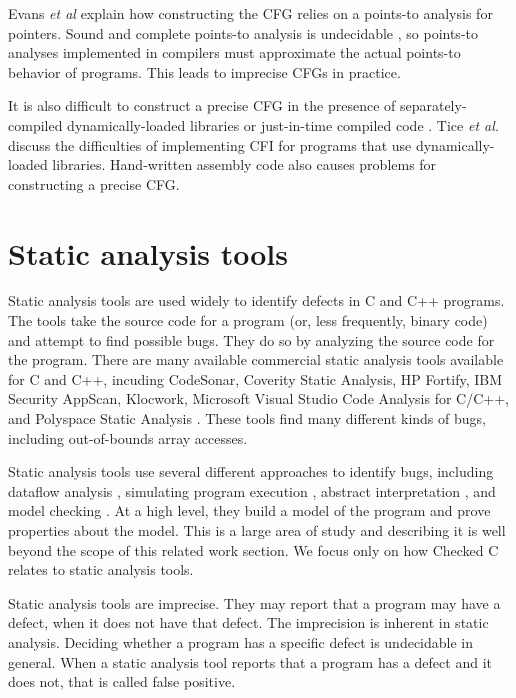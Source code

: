 Evans {\it et al} \cite{Evans2015} explain how constructing the CFG relies on a
points-to analysis for pointers.  Sound and complete points-to analysis is 
undecidable \cite{Ramalingam1994}, so points-to analyses implemented in compilers 
must approximate the actual points-to behavior of programs.  This leads to 
imprecise CFGs in practice.

It is also difficult to construct a precise CFG in the presence of 
separately-compiled dynamically-loaded libraries \cite{NiuPLDI2014} or just-in-time
compiled code \cite{NiuCCS2014}.  Tice {\it et al.} \cite{Tice2014} discuss the difficulties of implementing CFI for programs that use dynamically-loaded libraries. 
Hand-written assembly code also causes problems for constructing a precise CFG.

\section{Static analysis tools}

Static analysis tools are used widely to identify defects in C and C++ programs.
The tools take the source code for a program (or, less frequently, binary
code) and attempt to find possible bugs.  They do so by analyzing the source
code for the program.  There are many available commercial static analysis tools
available for C and C++, incuding CodeSonar, Coverity Static Analysis, HP Fortify, 
IBM Security AppScan, Klocwork, Microsoft Visual Studio Code Analysis for C/C++, and Polyspace Static Analysis \cite{Bessey2010,Bush2000,Emanuelsson2008}.    
These tools find many different kinds of bugs, including out-of-bounds array accesses.

Static analysis tools use several different approaches to identify bugs,
including dataflow analysis \cite{Aho2007,Shahriar2010}, simulating program 
execution \cite{Bush2000},  abstract interpretation \cite{Cousot1977}, 
and model checking
\cite{Larus2004}. At a high level, they build a  model of the program and 
prove properties about the model.  This is a large area of study and describing 
it is well beyond the scope of this related work section. We focus only on how
Checked C relates to static analysis tools.

Static analysis tools are imprecise.   They may report that a program
may have a defect, when it does not have that defect.  The imprecision
is inherent in static analysis.  Deciding whether a program has a specific defect is
undecidable in general.  When a static analysis tool reports that a program has a 
defect  and it does not, that is called false positive.

